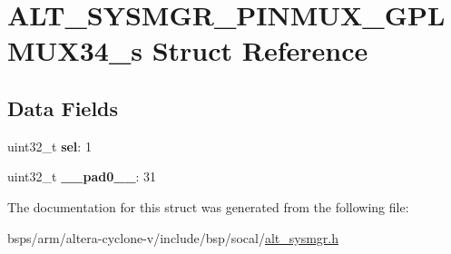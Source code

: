 \hypertarget{structALT__SYSMGR__PINMUX__GPLMUX34__s}{}\section{A\+L\+T\+\_\+\+S\+Y\+S\+M\+G\+R\+\_\+\+P\+I\+N\+M\+U\+X\+\_\+\+G\+P\+L\+M\+U\+X34\+\_\+s Struct Reference}
\label{structALT__SYSMGR__PINMUX__GPLMUX34__s}
\subsection*{Data Fields}
\begin{DoxyCompactItemize}
\item 
\mbox{\label{structALT__SYSMGR__PINMUX__GPLMUX34__s_adb0cca5065f7a3e2704e7986844577d7}} 
uint32\+\_\+t {\bfseries sel}\+: 1
\item 
\mbox{\label{structALT__SYSMGR__PINMUX__GPLMUX34__s_aea6f952f019163b50f7e526dbf12d749}} 
uint32\+\_\+t {\bfseries \+\_\+\+\_\+pad0\+\_\+\+\_\+}\+: 31
\end{DoxyCompactItemize}


The documentation for this struct was generated from the following file\+:\begin{DoxyCompactItemize}
\item 
bsps/arm/altera-\/cyclone-\/v/include/bsp/socal/\mbox{\hyperlink{alt__sysmgr_8h}{alt\+\_\+sysmgr.\+h}}\end{DoxyCompactItemize}
